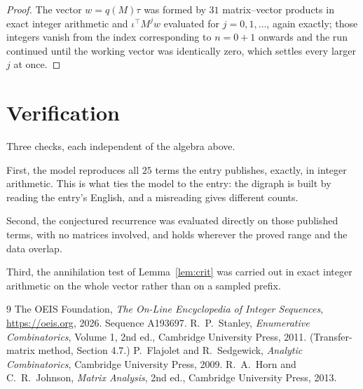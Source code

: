\documentclass[11pt,a4paper]{article}
\theoremstyle{plain}
\theoremstyle{definition}
\begin{document}
\begin{proof}
The vector $w=q(M)\tau$ was formed by $31$ matrix--vector products in exact integer
arithmetic and $\iota^{\!\top}M^{j}w$ evaluated for $j=0,1,\dots$, again exactly; those
integers vanish from the index corresponding to $n=0+1$ onwards and the run continued
until the working vector was identically zero, which settles every larger $j$ at once.
\end{proof}

\section{Verification}

Three checks, each independent of the algebra above.

First, the model reproduces all $25$ terms the entry publishes, exactly, in integer
arithmetic. This is what ties the model to the entry: the digraph is built by reading the
entry's English, and a misreading gives different counts.

Second, the conjectured recurrence was evaluated directly on those published terms, with no
matrices involved, and holds wherever the proved range and the data overlap.

Third, the annihilation test of Lemma~\ref{lem:crit} was carried out in exact integer
arithmetic on the whole vector rather than on a sampled prefix.

\begin{thebibliography}{9}
 The OEIS Foundation, \emph{The On-Line Encyclopedia of Integer
Sequences}, \url{https://oeis.org}, 2026. Sequence A193697.
 R.~P.~Stanley, \emph{Enumerative Combinatorics}, Volume 1, 2nd ed.,
Cambridge University Press, 2011. (Transfer-matrix method, Section 4.7.)
 P.~Flajolet and R.~Sedgewick, \emph{Analytic Combinatorics}, Cambridge
University Press, 2009.
 R.~A.~Horn and C.~R.~Johnson, \emph{Matrix Analysis}, 2nd ed., Cambridge
University Press, 2013.
\end{thebibliography}
\end{document}
